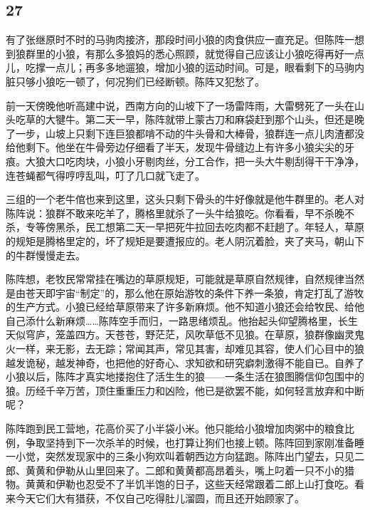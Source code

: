 \subsection*{27}



\par 有了张继原时不时的马驹肉接济，那段时间小狼的肉食供应一直充足。但陈阵一想到狼群里的小狼，有那么多狼妈的悉心照顾，就觉得自己应该让小狼吃得再好一点儿，吃撑一点儿；再多多地遛狼，增加小狼的运动时间。可是，眼看剩下的马驹内脏只够小狼吃一顿了，何况狗们已经断顿。陈阵又犯愁了。
\par 前一天傍晚他听高建中说，西南方向的山坡下了一场雷阵雨，大雷劈死了一头在山头吃草的大犍牛。第二天一早，陈阵就带上蒙古刀和麻袋赶到那个山头，但还是晚了一步，山坡上只剩下连巨狼都啃不动的牛头骨和大棒骨，狼群连一点儿肉渣都没给他剩下。他坐在牛骨旁边仔细看了半天，发现牛骨缝边上有许多小狼尖尖的牙痕。大狼大口吃肉块，小狼小牙剔肉丝，分工合作，把一头大牛剔刮得干干净净，连苍蝇都气得哼哼乱叫，叮了几口就飞走了。
\par 三组的一个老牛倌也来到这里，这头只剩下骨头的牛好像就是他牛群里的。老人对陈阵说：狼群不敢来吃羊了，腾格里就杀了一头牛给狼吃。你看看，早不杀晚不杀，专等傍黑杀，民工想第二天一早把死牛拉回去吃肉都不赶趟了。年轻人，草原的规矩是腾格里定的，坏了规矩是要遭报应的。老人阴沉着脸，夹了夹马，朝山下的牛群慢慢走去。
\par 陈阵想，老牧民常常挂在嘴边的草原规矩，可能就是草原自然规律，自然规律当然是由苍天即宇宙“制定”的，那么他在原始游牧的条件下养一条狼，肯定打乱了游牧的生产方式。小狼已经给草原带来了许多新麻烦。他不知道小狼还会给牧民、给他自己添什么新麻烦……陈阵空手而归，一路思绪烦乱。他抬起头仰望腾格里，长生天似穹庐，笼盖四方。天苍苍，野茫茫，风吹草低不见狼。在草原，狼群像幽灵鬼火一样，来无影，去无踪；常闻其声，常见其害，却难见其容，使人们心目中的狼越发诡秘，越发神奇，也把他的好奇心、求知欲和研究癖刺激得不能自已。自养了小狼以后，陈阵才真实地搂抱住了活生生的狼——一条生活在狼图腾信仰包围中的狼。历经千辛万苦，顶住重重压力和凶险，他已是欲罢不能，如何轻言放弃和中断呢？
\par 陈阵跑到民工营地，花高价买了小半袋小米。他只能给小狼增加肉粥中的粮食比例，争取坚持到下一次杀羊的时候，也打算让狗们也接上顿。陈阵回到家刚准备睡一小觉，突然发现家中的三条小狗欢叫着朝西边方向猛跑。陈阵出门望去，只见二郎、黄黄和伊勒从山里回来了。二郎和黄黄都高昂着头，嘴上叼着一只不小的猎物。黄黄和伊勒也忍受不了半饥半饱的日子，这些天经常跟着二郎上山打食吃。看来今天它们大有猎获，不仅自己吃得肚儿溜圆，而且还开始顾家了。

